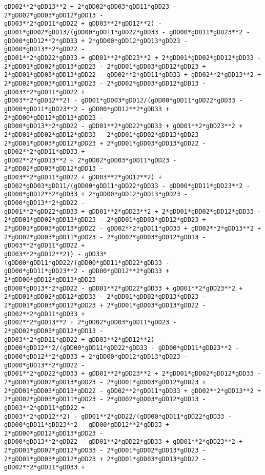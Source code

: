 \documentclass[landscape,letterpaper,10pt,english]{article}
\begin{document}
\begin{Verbatim}[commandchars=\\\{\}]
gDD02**2*gDD13**2 + 2*gDD02*gDD03*gDD11*gDD23 - 2*gDD02*gDD03*gDD12*gDD13 -
gDD03**2*gDD11*gDD22 + gDD03**2*gDD12**2) -
gDD01*gDD02*gDD13/(gDD00*gDD11*gDD22*gDD33 - gDD00*gDD11*gDD23**2 -
gDD00*gDD12**2*gDD33 + 2*gDD00*gDD12*gDD13*gDD23 - gDD00*gDD13**2*gDD22 -
gDD01**2*gDD22*gDD33 + gDD01**2*gDD23**2 + 2*gDD01*gDD02*gDD12*gDD33 -
2*gDD01*gDD02*gDD13*gDD23 - 2*gDD01*gDD03*gDD12*gDD23 +
2*gDD01*gDD03*gDD13*gDD22 - gDD02**2*gDD11*gDD33 + gDD02**2*gDD13**2 +
2*gDD02*gDD03*gDD11*gDD23 - 2*gDD02*gDD03*gDD12*gDD13 - gDD03**2*gDD11*gDD22 +
gDD03**2*gDD12**2) - gDD01*gDD03*gDD12/(gDD00*gDD11*gDD22*gDD33 -
gDD00*gDD11*gDD23**2 - gDD00*gDD12**2*gDD33 + 2*gDD00*gDD12*gDD13*gDD23 -
gDD00*gDD13**2*gDD22 - gDD01**2*gDD22*gDD33 + gDD01**2*gDD23**2 +
2*gDD01*gDD02*gDD12*gDD33 - 2*gDD01*gDD02*gDD13*gDD23 -
2*gDD01*gDD03*gDD12*gDD23 + 2*gDD01*gDD03*gDD13*gDD22 - gDD02**2*gDD11*gDD33 +
gDD02**2*gDD13**2 + 2*gDD02*gDD03*gDD11*gDD23 - 2*gDD02*gDD03*gDD12*gDD13 -
gDD03**2*gDD11*gDD22 + gDD03**2*gDD12**2) +
gDD02*gDD03*gDD11/(gDD00*gDD11*gDD22*gDD33 - gDD00*gDD11*gDD23**2 -
gDD00*gDD12**2*gDD33 + 2*gDD00*gDD12*gDD13*gDD23 - gDD00*gDD13**2*gDD22 -
gDD01**2*gDD22*gDD33 + gDD01**2*gDD23**2 + 2*gDD01*gDD02*gDD12*gDD33 -
2*gDD01*gDD02*gDD13*gDD23 - 2*gDD01*gDD03*gDD12*gDD23 +
2*gDD01*gDD03*gDD13*gDD22 - gDD02**2*gDD11*gDD33 + gDD02**2*gDD13**2 +
2*gDD02*gDD03*gDD11*gDD23 - 2*gDD02*gDD03*gDD12*gDD13 - gDD03**2*gDD11*gDD22 +
gDD03**2*gDD12**2)) - gDD33*(gDD00*gDD11*gDD22/(gDD00*gDD11*gDD22*gDD33 -
gDD00*gDD11*gDD23**2 - gDD00*gDD12**2*gDD33 + 2*gDD00*gDD12*gDD13*gDD23 -
gDD00*gDD13**2*gDD22 - gDD01**2*gDD22*gDD33 + gDD01**2*gDD23**2 +
2*gDD01*gDD02*gDD12*gDD33 - 2*gDD01*gDD02*gDD13*gDD23 -
2*gDD01*gDD03*gDD12*gDD23 + 2*gDD01*gDD03*gDD13*gDD22 - gDD02**2*gDD11*gDD33 +
gDD02**2*gDD13**2 + 2*gDD02*gDD03*gDD11*gDD23 - 2*gDD02*gDD03*gDD12*gDD13 -
gDD03**2*gDD11*gDD22 + gDD03**2*gDD12**2) -
gDD00*gDD12**2/(gDD00*gDD11*gDD22*gDD33 - gDD00*gDD11*gDD23**2 -
gDD00*gDD12**2*gDD33 + 2*gDD00*gDD12*gDD13*gDD23 - gDD00*gDD13**2*gDD22 -
gDD01**2*gDD22*gDD33 + gDD01**2*gDD23**2 + 2*gDD01*gDD02*gDD12*gDD33 -
2*gDD01*gDD02*gDD13*gDD23 - 2*gDD01*gDD03*gDD12*gDD23 +
2*gDD01*gDD03*gDD13*gDD22 - gDD02**2*gDD11*gDD33 + gDD02**2*gDD13**2 +
2*gDD02*gDD03*gDD11*gDD23 - 2*gDD02*gDD03*gDD12*gDD13 - gDD03**2*gDD11*gDD22 +
gDD03**2*gDD12**2) - gDD01**2*gDD22/(gDD00*gDD11*gDD22*gDD33 -
gDD00*gDD11*gDD23**2 - gDD00*gDD12**2*gDD33 + 2*gDD00*gDD12*gDD13*gDD23 -
gDD00*gDD13**2*gDD22 - gDD01**2*gDD22*gDD33 + gDD01**2*gDD23**2 +
2*gDD01*gDD02*gDD12*gDD33 - 2*gDD01*gDD02*gDD13*gDD23 -
2*gDD01*gDD03*gDD12*gDD23 + 2*gDD01*gDD03*gDD13*gDD22 - gDD02**2*gDD11*gDD33 +

\end{Verbatim}
\end{document}

